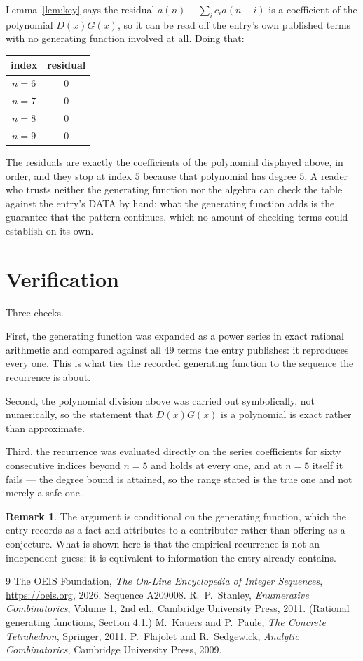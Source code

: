 \documentclass[11pt,a4paper]{article}
\theoremstyle{plain}
\theoremstyle{definition}
\newtheorem{remark}[theorem]{Remark}
\begin{document}
Lemma~\ref{lem:key} says the residual $a(n)-\sum_ic_ia(n-i)$ is a coefficient of the
polynomial $D(x)G(x)$, so it can be read off the entry's own published terms with no
generating function involved at all. Doing that:
\begin{center}
\begin{tabular}{cc}
index & residual \\ \hline
$n=6$ & $0$ \\
$n=7$ & $0$ \\
$n=8$ & $0$ \\
$n=9$ & $0$
\end{tabular}
\end{center}
The residuals are exactly the coefficients of the polynomial displayed above, in order, and
they stop at index $5$ because that polynomial has degree $5$. A reader who trusts
neither the generating function nor the algebra can check the table against the entry's DATA
by hand; what the generating function adds is the guarantee that the pattern continues, which
no amount of checking terms could establish on its own.

\section{Verification}

Three checks.

First, the generating function was expanded as a power series in exact rational arithmetic and
compared against all $49$ terms the entry publishes: it reproduces every one. This is
what ties the recorded generating function to the sequence the recurrence is about.

Second, the polynomial division above was carried out symbolically, not numerically, so the
statement that $D(x)G(x)$ is a polynomial is exact rather than approximate.

Third, the recurrence was evaluated directly on the series coefficients for sixty consecutive
indices beyond $n=5$ and holds at every one, and at $n=5$ itself it fails --- the
degree bound is attained, so the range stated is the true one and not merely a safe one.

\begin{remark}
The argument is conditional on the generating function, which the entry records as a fact and
attributes to a contributor rather than offering as a conjecture. What is shown here is that
the empirical recurrence is not an independent guess: it is equivalent to information the
entry already contains.
\end{remark}

\begin{thebibliography}{9}
 The OEIS Foundation, \emph{The On-Line Encyclopedia of Integer
Sequences}, \url{https://oeis.org}, 2026. Sequence A209008.
 R.~P.~Stanley, \emph{Enumerative Combinatorics}, Volume 1, 2nd ed.,
Cambridge University Press, 2011. (Rational generating functions, Section 4.1.)
 M.~Kauers and P.~Paule, \emph{The Concrete Tetrahedron}, Springer, 2011.
 P.~Flajolet and R.~Sedgewick, \emph{Analytic Combinatorics}, Cambridge
University Press, 2009.
\end{thebibliography}
\end{document}
